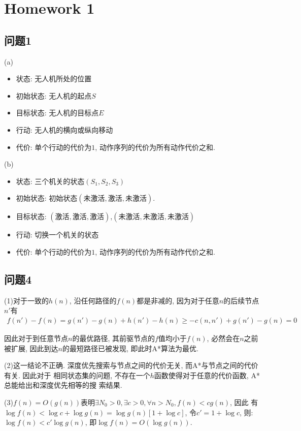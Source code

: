 \section{Homework 1}

\subsection{问题1}

(a)
\begin{itemize}
    \item 状态: 无人机所处的位置
    \item 初始状态: 无人机的起点$S$
    \item 目标状态: 无人机的目标点$E$
    \item 行动: 无人机的横向或纵向移动
    \item 代价: 单个行动的代价为$1$, 动作序列的代价为所有动作代价之和.
\end{itemize}

(b)
\begin{itemize}
    \item 状态: 三个机关的状态$(S_1,S_2,S_3)$
    \item 初始状态: 初始状态$(\text{未激活},\text{激活},\text{未激活})$.
    \item 目标状态: $(\text{激活},\text{激活},\text{激活})$,$(\text{未激活},\text
    {未激活},\text{未激活})$
    \item 行动: 切换一个机关的状态
    \item 代价: 单个行动的代价为$1$, 动作序列的代价为所有动作代价之和.
\end{itemize}

\subsection{问题4}

(1)对于一致的$h(n)$, 沿任何路径的$f(n)$都是非减的, 因为对于任意$n$的后续节点$n'$有
\begin{align*}
    f(n')-f(n)=g(n')-g(n)+h(n')-h(n) \ge -c(n,n')+g(n')-g(n)=0
\end{align*}

因此对于到任意节点$n$的最优路径, 其前驱节点的$f$值均小于$f(n)$, 必然会在$n$之前被扩展,
因此到达$n$的最短路径已被发现, 即此时A*算法为最优.

(2)这一结论不正确. 深度优先搜索与节点之间的代价无关, 而A*与节点之间的代价有关. 因此对于
相同状态集的问题, 不存在一个$h$函数使得对于任意的代价函数, A*总能给出和深度优先相等的搜
索结果.

(3)$f(n)=O(g(n))$表明$\exists N_0>0, \exists c>0, \forall n>N_0,f(n)<cg(n)$, 因此
有$\log f(n) < \log c + \log g(n)=\log g(n)[1+\log c]$, 令$c'=1+\log c$, 则:$\log
f(n)<c'\log g(n)$, 即$\log f(n)=O(\log g(n))$.
